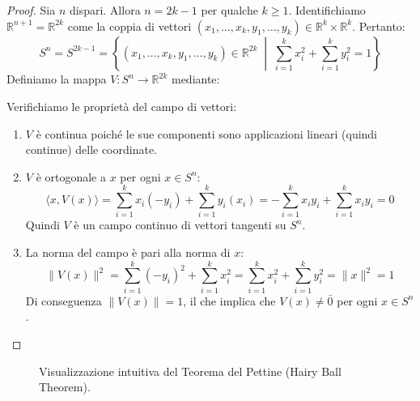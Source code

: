\begin{proof}
Sia $n$ dispari. Allora $n = 2k-1$ per qualche $k \geqslant 1$. Identifichiamo $\mathbb{R}^{n+1} = \mathbb{R}^{2k}$ come la coppia di vettori $(x_1, \dots, x_k, y_1, \dots, y_k) \in \mathbb{R}^k \times \mathbb{R}^k$. Pertanto:
\[
S^n = S^{2k-1} = \left\{ (x_1, \dots, x_k, y_1, \dots, y_k) \in \mathbb{R}^{2k} \;\middle|\; \sum_{i=1}^k x_i^2 + \sum_{i=1}^k y_i^2 = 1 \right\}
\]
Definiamo la mappa $V: S^n \to \mathbb{R}^{2k}$ mediante:

Verifichiamo le proprietà del campo di vettori:
\begin{enumerate}[label=\roman*)]
    \item $V$ è continua poiché le sue componenti sono applicazioni lineari (quindi continue) delle coordinate.
    \item $V$ è ortogonale a $x$ per ogni $x \in S^n$:
    \[
    \langle x, V(x) \rangle = \sum_{i=1}^k x_i(-y_i) + \sum_{i=1}^k y_i(x_i) = -\sum_{i=1}^k x_i y_i + \sum_{i=1}^k x_i y_i = 0
    \]
    Quindi $V$ è un campo continuo di vettori tangenti su $S^n$.
    \item La norma del campo è pari alla norma di $x$:
    \[
    \|V(x)\|^2 = \sum_{i=1}^k (-y_i)^2 + \sum_{i=1}^k x_i^2 = \sum_{i=1}^k x_i^2 + \sum_{i=1}^k y_i^2 = \|x\|^2 = 1
    \]
    Di conseguenza $\|V(x)\| = 1$, il che implica che $V(x) \neq \bar{0}$ per ogni $x \in S^n$.
\end{enumerate}
\end{proof}

\begin{figure}[H]
    \centering
    \caption{Visualizzazione intuitiva del Teorema del Pettine (Hairy Ball Theorem).}
\end{figure}

